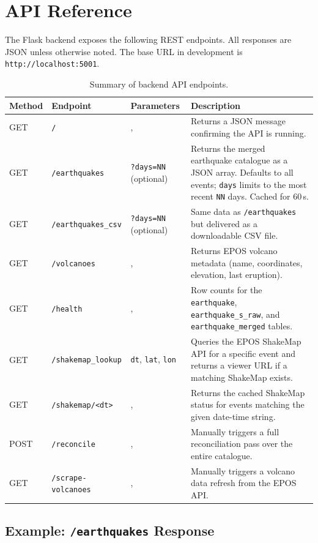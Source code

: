 \documentclass[12pt]{article}
\begin{document}
\clearpage
\section{API Reference}
\label{app:api}

The Flask backend exposes the following REST endpoints. All responses are JSON unless otherwise noted. The base URL in development is \texttt{http://localhost:5001}.

\begin{table}[H]
\centering
\small
\begin{tabular}{l l l p{5.5cm}}
\hline
\textbf{Method} & \textbf{Endpoint} & \textbf{Parameters} & \textbf{Description} \\
\hline
GET & \texttt{/} & ,  & Returns a JSON message confirming the API is running. \\
GET & \texttt{/earthquakes} & \texttt{?days=NN} (optional) & Returns the merged earthquake catalogue as a JSON array. Defaults to all events; \texttt{days} limits to the most recent \texttt{NN} days. Cached for 60\,s. \\
GET & \texttt{/earthquakes\_csv} & \texttt{?days=NN} (optional) & Same data as \texttt{/earthquakes} but delivered as a downloadable CSV file. \\
GET & \texttt{/volcanoes} & ,  & Returns EPOS volcano metadata (name, coordinates, elevation, last eruption). \\
GET & \texttt{/health} & ,  & Row counts for the \texttt{earthquake}, \texttt{earthquake\_s\_raw}, and \texttt{earthquake\_merged} tables. \\
GET & \texttt{/shakemap\_lookup} & \texttt{dt}, \texttt{lat}, \texttt{lon} & Queries the EPOS ShakeMap API for a specific event and returns a viewer URL if a matching ShakeMap exists. \\
GET & \texttt{/shakemap/<dt>} & ,  & Returns the cached ShakeMap status for events matching the given date-time string. \\
POST & \texttt{/reconcile} & ,  & Manually triggers a full reconciliation pass over the entire catalogue. \\
GET & \texttt{/scrape-volcanoes} & ,  & Manually triggers a volcano data refresh from the EPOS API. \\
\hline
\end{tabular}
\caption{Summary of backend API endpoints.}
\label{tab:api-endpoints}
\end{table}

\subsection*{Example: \texttt{/earthquakes} Response}
\end{document}
